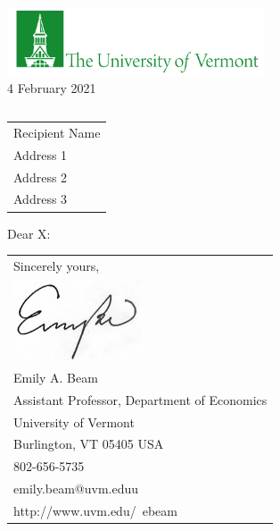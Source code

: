 \documentclass[10pt]{article} %
\begin{document}

\raggedright %
\includegraphics[scale=0.2,width = 3in]{images/UVMLogoSolid7484.jpg}\\ %

 \hfill\hfill\hfill %
 4 February 2021\\[10pt]  %
 
\begin{tabular}{l@{}}
\end{tabular}

\begin{tabular}{@{}l}
Recipient Name\\
Address 1\\
Address 2\\
Address 3
\end{tabular}


Dear X:

\lipsum[1-2]





\begin{tabular}{@{}l}
Sincerely yours,\\
\includegraphics[scale=0.15,width=1.5in]{images/beam_sig.png}\\
Emily A. Beam\\
Assistant Professor, Department of Economics\\
University of Vermont\\
Burlington, VT 05405 USA\\
802-656-5735\\
emily.beam@uvm.eduu\\
http://www.uvm.edu/~ebeam\\
\end{tabular}
\end{document}
